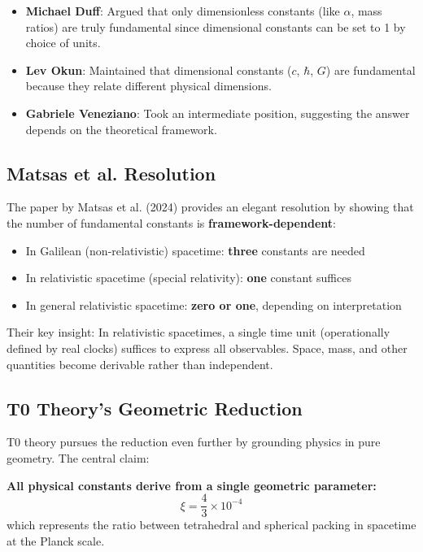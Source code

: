 	\begin{itemize}
		\item \textbf{Michael Duff}: Argued that only dimensionless constants (like $\alpha$, mass ratios) are truly fundamental since dimensional constants can be set to 1 by choice of units.
		
		\item \textbf{Lev Okun}: Maintained that dimensional constants ($c$, $\hbar$, $G$) are fundamental because they relate different physical dimensions.
		
		\item \textbf{Gabriele Veneziano}: Took an intermediate position, suggesting the answer depends on the theoretical framework.
	\end{itemize}
	
	\subsection{Matsas et al. Resolution}
	
	The paper by Matsas et al. (2024) provides an elegant resolution by showing that the number of fundamental constants is \textbf{framework-dependent}:
	
	\begin{itemize}
		\item In Galilean (non-relativistic) spacetime: \textbf{three} constants are needed
		\item In relativistic spacetime (special relativity): \textbf{one} constant suffices
		\item In general relativistic spacetime: \textbf{zero or one}, depending on interpretation
	\end{itemize}
	
	Their key insight: In relativistic spacetimes, a single time unit (operationally defined by real clocks) suffices to express all observables. Space, mass, and other quantities become derivable rather than independent.
	
	\subsection{T0 Theory's Geometric Reduction}
	
	T0 theory pursues the reduction even further by grounding physics in pure geometry. The central claim:
	
	\begin{keyresult}
		\textbf{All physical constants derive from a single geometric parameter:}
		\[
		\xi = \frac{4}{3} \times 10^{-4}
		\]
		which represents the ratio between tetrahedral and spherical packing in spacetime at the Planck scale.
	\end{keyresult}
	
